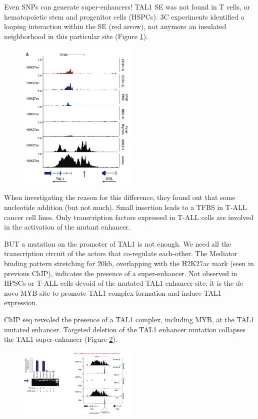 Even SNPs can generate super-enhancers! TAL1 SE was not found in T cells, or hematopoietic stem and progenitor cells (HSPCs). 3C experiments identified a looping interaction within the SE (red arrow), not anymore an insulated neighborhood in this particular site (Figure \ref{fig:talju}).

\begin{figure}
\centering
\includegraphics[width=0.5\textwidth]{../_resources/c099d4a9ad4bba13e7839f48fd831265.png}
\caption{}
\label{fig:talju}
\end{figure}

When investigating the reason for this difference, they found out that some nucleotide addition (but not much). Small insertion leads to a TFBS in T-ALL cancer cell lines. Only transcription factors expressed in T-ALL cells are involved in the activation of the mutant enhancer.

BUT a mutation on the promoter of TAL1 is not enough. We need all the transcription circuit of the actors that co-regulate each-other. The Mediator binding pattern stretching for 20kb, overlapping with the H2K27ac mark (seen in previous ChIP), indicates the presence of a super-enhancer. Not observed in HPSCs or T-ALL cells devoid of the mutated TAL1 enhancer site: it is the de novo MYB site to promote TAL1 complex formation and induce TAL1 expression.

ChIP seq revealed the presence of a TAL1 complex, including MYB, at the TAL1 mutated enhancer.
Targeted deletion of the TAL1 enhancer mutation collapses the TAL1 super-enhancer (Figure \ref{fig:deltal}).

\begin{figure}
\centering
\includegraphics[width=0.5\textwidth]{../_resources/dfb8371fc17e078308c3d5aa247ebcbf.png}
\caption{}
\label{fig:deltal}
\end{figure}

